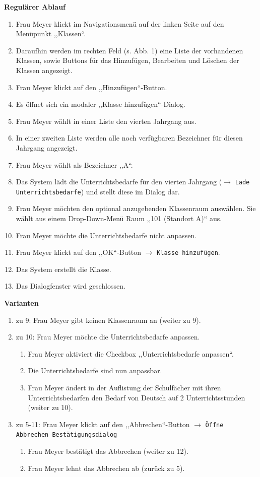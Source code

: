 \documentclass[fontsize=12pt,paper=a4,twoside]{scrartcl}
\begin{document}
\textbf{Regulärer Ablauf}
\begin{enumerate}
\item Frau Meyer klickt im Navigationsmenü auf der linken Seite auf den Menüpunkt ,,Klassen``.
\item Daraufhin werden im rechten Feld (s. Abb. 1) eine Liste der vorhandenen Klassen, sowie Buttons für das Hinzufügen, Bearbeiten und Löschen der Klassen angezeigt.
\item Frau Meyer klickt auf den ,,Hinzufügen``-Button.
\item Es öffnet sich ein modaler ,,Klasse hinzufügen``-Dialog.
\item Frau Meyer wählt in einer Liste den vierten Jahrgang aus. 
\item In einer zweiten Liste werden alle noch verfügbaren Bezeichner für diesen Jahrgang angezeigt.
\item Frau Meyer wählt als Bezeichner ,,A``.
\item Das System lädt die  Unterrichtsbedarfe für den vierten Jahrgang ($\rightarrow$ \texttt{Lade Unterrichtsbedarfe}) und stellt diese im Dialog dar.
\item Frau Meyer möchten den optional anzugebenden Klassenraum auswählen. Sie wählt aus einem Drop-Down-Menü Raum ,,101 (Standort A)`` aus.
\item Frau Meyer möchte die Unterrichtsbedarfe nicht anpassen.
\item Frau Meyer klickt auf den ,,OK``-Button $\rightarrow$ \texttt{Klasse hinzufügen}.
\item Das System erstellt die Klasse. 
\item Das Dialogfenster wird geschlossen.
\end{enumerate}
\vspace{5pt}


\textbf{Varianten}
\begin{enumerate}
\item zu 9: Frau Meyer gibt keinen Klassenraum an (weiter zu 9). 
\item zu 10: Frau Meyer möchte die Unterrichtsbedarfe anpassen.
	\begin{enumerate}[label={\arabic*.}]
	\item Frau Meyer aktiviert die Checkbox ,,Unterrichtsbedarfe anpassen``.
	\item Die Unterrichtsbedarfe sind nun anpassbar.
	\item Frau Meyer ändert in der Auflistung der Schulfächer mit ihren Unterrichtsbedarfen den Bedarf von Deutsch auf 2 Unterrichtsstunden (weiter zu 10).
	\end{enumerate}
\item zu 5-11: Frau Meyer klickt auf den ,,Abbrechen``-Button $\rightarrow$ \texttt{Öffne Abbrechen Bestätigungsdialog}
	\begin{enumerate}[label={\alph*.}]
	\item Frau Meyer bestätigt das Abbrechen (weiter zu 12).
	\item Frau Meyer lehnt das Abbrechen ab (zurück zu 5).
	\end{enumerate}
\end{enumerate}
\vspace{5pt}
\end{document}
